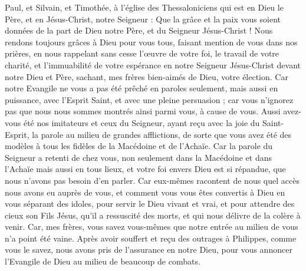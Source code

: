 \begin{multicols}{2}
\VerseOne{}Paul, et Silvain, et Timothée, à l'église des Thessaloniciens qui est en Dieu le Père, et en Jésus-Christ, notre Seigneur : Que la grâce et la paix vous soient données de la part de Dieu notre Père, et du Seigneur Jésus-Christ !
Nous rendons toujours grâces à Dieu pour vous tous, faisant mention de vous dans nos prières,
en nous rappelant sans cesse l'œuvre de votre foi, le travail de votre charité, et l'immuabilité de votre espérance en notre Seigneur Jésus-Christ devant notre Dieu et Père,
sachant, mes frères bien-aimés de Dieu, votre élection.
Car notre Evangile ne vous a pas été prêché en paroles seulement, mais aussi en puissance, avec l'Esprit Saint, et avec une pleine persuasion ; car vous n'ignorez pas que nous nous sommes montrés ainsi parmi vous, à cause de vous.
Aussi avez-vous été nos imitateurs et ceux du Seigneur, ayant reçu avec la joie du Saint-Esprit, la parole au milieu de grandes afflictions,
de sorte que vous avez été des modèles à tous les fidèles de la Macédoine et de l'Achaïe.
Car la parole du Seigneur a retenti de chez vous, non seulement dans la Macédoine et dans l'Achaïe mais aussi en tous lieux, et votre foi envers Dieu est si répandue, que nous n'avons pas besoin d'en parler.
Car eux-mêmes racontent de nous quel accès nous avons eu auprès de vous, et comment vous vous êtes convertis à Dieu en vous séparant des idoles, pour servir le Dieu vivant et vrai,
et pour attendre des cieux son Fils Jésus, qu'il a ressuscité des morts, et qui nous délivre de la colère à venir.
\VerseOne{}Car, mes frères, vous savez vous-mêmes que notre entrée au milieu de vous n'a point été vaine. 
Après avoir souffert et reçu des outrages à Philippes, comme vous le savez, nous avons pris de l'assurance en notre Dieu, pour vous annoncer l'Evangile de Dieu au milieu de beaucoup de combats.

\end{multicols}
